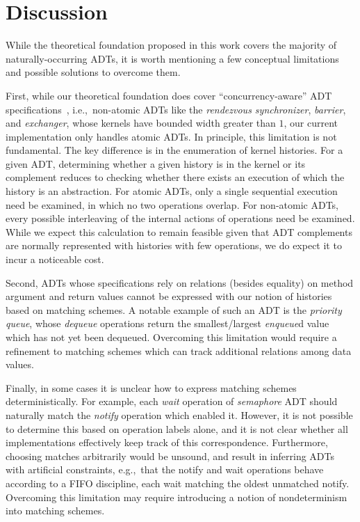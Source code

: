 \section{Discussion}
\label{sec:discussion}

While the theoretical foundation proposed in this work covers the majority of
naturally-occurring ADTs, it is worth mentioning a few conceptual limitations
and possible solutions to overcome them.

First, while our theoretical foundation does cover “concurrency-aware” ADT
specifications~\cite{conf/podc/HemedR14}, i.e.,~non-atomic ADTs like the
\emph{rendezvous synchronizer}, \emph{barrier}, and \emph{exchanger}, whose
kernels have bounded width greater than $1$, our current implementation only
handles atomic ADTs. In principle, this limitation is not fundamental. The key
difference is in the enumeration of kernel histories. For a given ADT,
determining whether a given history is in the kernel or its complement reduces
to checking whether there exists an execution of which the history is an
abstraction. For atomic ADTs, only a single sequential execution need be
examined, in which no two operations overlap. For non-atomic ADTs, every
possible interleaving of the internal actions of operations need be examined.
While we expect this calculation to remain feasible given that ADT complements
are normally represented with histories with few operations, we do expect it to
incur a noticeable cost.

Second, ADTs whose specifications rely on relations (besides equality) on
method argument and return values cannot be expressed with our notion of
histories based on matching schemes. A notable example of such an ADT is the
\emph{priority queue}, whose \emph{dequeue} operations return the
smallest/largest \emph{enqueue}d value which has not yet been dequeued. 
Overcoming this limitation would
require a refinement to matching schemes which can track additional relations
among data values.

Finally, in some cases it is unclear how to express matching schemes
deterministically. For example, each \emph{wait} operation of \emph{semaphore}
ADT should naturally match the \emph{notify} operation which enabled it.
However, it is not possible to determine this based on operation labels alone,
and it is not clear whether all implementations effectively keep track of this
correspondence. Furthermore, choosing matches arbitrarily would be unsound, and
result in inferring ADTs with artificial constraints, e.g.,~that the notify and
wait operations behave according to a FIFO discipline, each wait matching the
oldest unmatched notify. Overcoming this limitation may require introducing a
notion of nondeterminism into matching schemes.

